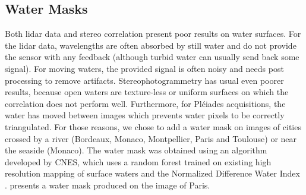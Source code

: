 \subsection{Water Masks}
Both \acrshort{lidar} data and stereo correlation present poor results on water surfaces. For the \acrshort{lidar} data, wavelengths are often absorbed by still water and do not provide the sensor with any feedback (although turbid water can usually send back some signal). For moving waters, the provided signal is often noisy and needs post processing to remove artifacts. Stereophotogrammetry has usual even poorer results, because open waters are texture-less or uniform surfaces on which the correlation does not perform well. Furthermore, for Pléiades acquisitions, the water has moved between images which prevents water pixels to be correctly triangulated. For those reasons, we chose to add a water mask on images of cities crossed by a river (Bordeaux, Monaco, Montpellier, Paris and Toulouse) or near the seaside (Monaco). The water mask was obtained using an algorithm developed by CNES, which uses a random forest trained on existing high resolution mapping of surface waters \cite{pekel_high-resolution_2016} and the Normalized Difference Water Index \cite{gao_ndwinormalized_1996}.  presents a water mask produced on the image of Paris.

